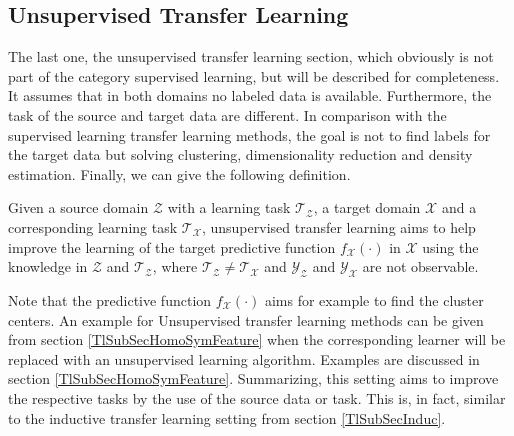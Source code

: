 \subsection{Unsupervised Transfer Learning}\label{TlSubSecUnsuper}
The last one, the unsupervised transfer learning section, which obviously is not part of the category supervised learning, but will be described for completeness.
It assumes that in both domains no labeled data is available.
Furthermore, the task of the source and target data are different.
In comparison with the supervised learning transfer learning methods, the goal is not to find labels for the target data but solving clustering, dimensionality reduction and density estimation.\cite{Pan.2010}
Finally, we can give the following definition.
\begin{mDef}\label{DefUTL}
	 Given a source domain $\mathcal{Z}$ with a learning task $\mathcal{T_Z}$, a target domain $\mathcal{X}$ and a corresponding learning task $\mathcal{T_X}$, unsupervised transfer learning aims to help improve the learning of the target predictive function $f_\mathcal{X}(\cdot)$ in $\mathcal{X}$ using the knowledge in $\mathcal{Z}$ and $\mathcal{T_Z}$, where $\mathcal{T_Z} \neq \mathcal{T_X}$ and $\mathcal{Y_Z}$ and $\mathcal{Y_X}$ are not observable.
\end{mDef}
Note that the predictive function $f_\mathcal{X}(\cdot)$ aims for example to find the cluster centers.
An example for Unsupervised transfer learning methods can be given from section \ref{TlSubSecHomoSymFeature} when the corresponding learner will be replaced with an unsupervised learning algorithm.
Examples are discussed in section \ref{TlSubSecHomoSymFeature}.
Summarizing, this setting aims to improve the respective tasks by the use of the source data or task.
This is, in fact, similar to the inductive transfer learning setting from section \ref{TlSubSecInduc}.\cite{Pan.2010}

